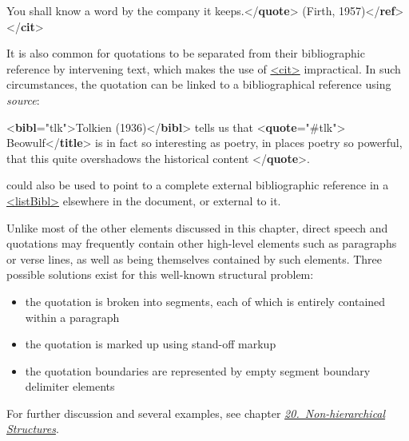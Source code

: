 \begin{shaded}
You shall know a word by the company it keeps.{</\textbf{quote}>}\mbox{}\newline 
{}(Firth, 1957){</\textbf{ref}>}\mbox{}\newline 
{</\textbf{cit}>}\end{shaded}\egroup\par \noindent  It is also common for quotations to be separated from their bibliographic reference by intervening text, which makes the use of \hyperref[TEI.cit]{<cit>} impractical. In such circumstances, the quotation can be linked to a bibliographical reference using {\itshape source}: \par\bgroup{}\exampleFont \begin{shaded}\noindent\mbox{}{<\textbf{bibl}\hspace*{1em}{xml:id}="{tlk}">}Tolkien (1936){</\textbf{bibl}>} tells us that\mbox{}\newline 
{<\textbf{quote}\hspace*{1em}{source}="{\#tlk}">}\mbox{}\newline 
{}Beowulf{</\textbf{title}>} is in fact so interesting as\mbox{}\newline 
 poetry, in places poetry so powerful, that this quite\mbox{}\newline 
 overshadows the historical content\mbox{}\newline 
{</\textbf{quote}>}.\end{shaded}\egroup\par {} could also be used to point to a complete external bibliographic reference in a \hyperref[TEI.listBibl]{<listBibl>} elsewhere in the document, or external to it.\par
Unlike most of the other elements discussed in this chapter, direct speech and quotations may frequently contain other high-level elements such as paragraphs or verse lines, as well as being themselves contained by such elements. Three possible solutions exist for this well-known structural problem: \begin{itemize}
\item the quotation is broken into segments, each of which is entirely contained within a paragraph
\item the quotation is marked up using stand-off markup
\item the quotation boundaries are represented by empty segment boundary delimiter elements
\end{itemize}  For further discussion and several examples, see chapter \textit{\hyperref[NH]{20.\ Non-hierarchical Structures}}.\par
